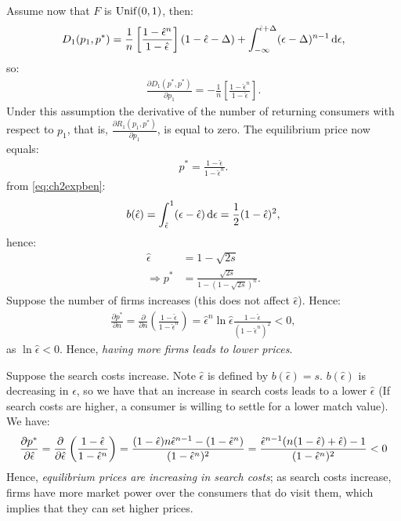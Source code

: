 Assume now that $F$ is $\mathrm{Unif}(0,1)$, then:
\begin{align}
	D_1(p_1,p^*)=\frac{1}{n}
	\left[\frac{1-\hat\epsilon^n}{1-\hat\epsilon}\right]
	(1-\hat\epsilon-\Delta)+
	\int_{-\infty}^{\hat\epsilon+\Delta}(\epsilon-\Delta)^{n-1}\,\textrm{d}\epsilon,
\end{align}
so:
\begin{align}
	\frac{\partial D_1(p^*,p^*)}{\partial p_1}=-\frac{1}{n}
	\left[\frac{1-\hat\epsilon^n}{1-\hat\epsilon}\right].
\end{align}
Under this assumption the derivative of the number of returning
consumers with respect to $p_1$, that is,
$\frac{\partial R_1(p_1,p^*)}{\partial p_1}$, is equal to zero. The
equilibrium price now equals:
\begin{align}
	p^*=\frac{1-\hat\epsilon}{1-\hat\epsilon^n}.
\end{align}
from \ref{eq:ch2expben}:
\begin{align}
	b(\hat\epsilon)=\int_{\hat\epsilon}^1(\epsilon-\hat\epsilon)\,\textrm{d}\epsilon
	=\frac{1}{2}(1-\hat\epsilon)^2,
\end{align}
hence:
\begin{align}
	\hat\epsilon        & =1-\sqrt{2s}                          \\
	\Longrightarrow p^* & =\frac{\sqrt{2s}}{1-(1-\sqrt{2s})^n}.
\end{align}
Suppose the number of firms increases (this does not affect
$\hat\epsilon$). Hence:
\begin{align}
	\frac{\partial p^*}{\partial n}=
	\frac{\partial}{\partial n}\left(\frac{1-\hat\epsilon}{1-\hat\epsilon^n}\right)
	=\hat\epsilon^n\ln{\hat\epsilon}\frac{1-\hat\epsilon}{(1-\hat\epsilon^n)^2}
	<0,
\end{align}
as $\ln{\hat\epsilon}<0$. Hence, \textit{having more firms leads to lower
	prices}.

Suppose the search costs increase. Note $\hat\epsilon$ is defined by
$b(\hat\epsilon)=s$. $b(\hat\epsilon)$ is decreasing in $\epsilon$, so
we have that an increase in search costs leads to a lower $\hat\epsilon$
(If search costs are higher, a consumer is willing to settle for a lower
match value). We have:
\begin{align}
	\frac{\partial p^*}{\partial \hat\epsilon}=\frac{\partial }{\partial \hat\epsilon}
	\left(\frac{1-\hat\epsilon}{1-\hat\epsilon^n}\right)
	=\frac{(1-\hat\epsilon)n\hat\epsilon^{n-1}-(1-\hat\epsilon^n)}{(1-\hat\epsilon^n)^2}
	=\frac{\hat\epsilon^{n-1}(n(1-\hat\epsilon)+\hat\epsilon)-1}{(1-\hat\epsilon^n)^2}
	<0
\end{align}
Hence, \textit{equilibrium prices are increasing in search costs}; as
search costs increase, firms have more market power over the consumers
that do visit them, which implies that they can set higher prices.
